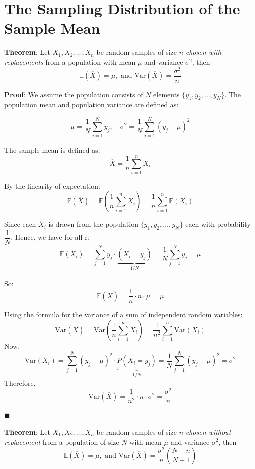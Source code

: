 \documentclass[twoside]{book}
\begin{document}
\section{The Sampling Distribution of the Sample Mean}

\begin{textbox}
\textbf{Theorem}: Let $X_1 , X_2, \dots , X_n$ be random samples of size $n$ \textit{chosen with replacements} from a population with mean $\mu$ and variance $\sigma^2$, then
$$\mathbb{E}(\overline{X}) = \mu,  \text{ and } \mathrm{Var}(\overline{X}) = \dfrac{\sigma^2}{n}$$
\end{textbox}

\textbf{Proof}: We assume the population consists of $N$ elements $\{y_1, y_2, \dots, y_N\}$. The population mean and population variance are defined as:

$$\mu = \dfrac{1}{N}\sum_{j=1}^N y_j, \quad \sigma^2 = \dfrac{1}{N}\sum_{j=1}^N (y_j - \mu)^2$$

The sample mean is defined as:
\[
\overline{X} = \frac{1}{n} \sum_{i=1}^{n} X_i
\]

By the linearity of expectation:
\[
\mathbb{E}(\overline{X}) = \mathbb{E}\left( \frac{1}{n} \sum_{i=1}^{n} X_i \right) = \frac{1}{n} \sum_{i=1}^{n} \mathbb{E}(X_i)
\]

Since each \( X_i \) is drawn from the population $\{y_1, y_2, \dots, y_N\}$ each with probability $\dfrac{1}{N}$. Hence, we have for all $i$:
\[
\mathbb{E}(X_i) = \sum_{j=1}^N y_j \cdot \underbrace{(X_i = y_j)}_{1/N}
 = \dfrac{1}{N}\sum_{j=1}^N y_j  = \mu
\]

So:
\[
\mathbb{E}(\overline{X}) = \frac{1}{n} \cdot n \cdot \mu = \mu
\]

Using the formula for the variance of a sum of independent random variables:
\[
\mathrm{Var}(\overline{X}) = \mathrm{Var} \left( \frac{1}{n} \sum_{i=1}^{n} X_i \right) = \frac{1}{n^2} \sum_{i=1}^{n} \mathrm{Var}(X_i)
\]
Now,
$$\mathrm{Var}(X_i) = \sum_{j=1}^N (y_j - \mu)^2 \cdot \underbrace{P(X_i = y_j)}_{1/N} = \dfrac{1}{N}\sum_{j=1}^N (y_j - \mu)^2 = \sigma^2$$
Therefore,
\[
\mathrm{Var}(\overline{X}) = \frac{1}{n^2} \cdot n \cdot \sigma^2 = \frac{\sigma^2}{n}
\]



\hfill $\blacksquare$

\begin{textbox}
\textbf{Theorem}: Let $X_1 , X_2, \dots , X_n$ be random samples of size $n$ \textit{chosen without replacement} from a population of size $N$ with mean $\mu$ and variance $\sigma^2$, then
$$\mathbb{E}(\overline{X}) = \mu,  \text{ and } \mathrm{Var}(\overline{X}) = \dfrac{\sigma^2}{n}\left(\dfrac{N-n}{N-1}\right)$$
\end{textbox}
\end{document}
